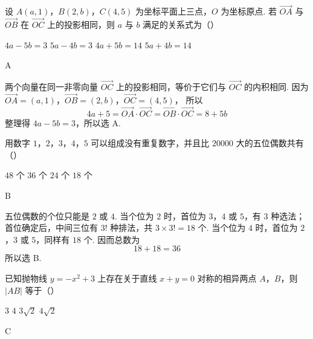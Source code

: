 \begin{problem}
设 \(A(a,1)\)，\(B(2,b)\)，\(C(4,5)\) 为坐标平面上三点，\(O\) 为坐标原点. 若 \(\overrightarrow{OA}\) 与 \(\overrightarrow{OB}\) 在 \(\overrightarrow{OC}\) 上的投影相同，则 \(a\) 与 \(b\) 满足的关系式为（\quad）

\choices
    {\(4a - 5b = 3\)}
    {\(5a - 4b = 3\)}
    {\(4a + 5b = 14\)}
    {\(5a + 4b = 14\)}
\end{problem}

\begin{answer}
A
\end{answer}

\begin{solution}
两个向量在同一非零向量 \(\overrightarrow{OC}\) 上的投影相同，等价于它们与 \(\overrightarrow{OC}\) 的内积相同. 因为 \(\overrightarrow{OA}=(a,1)\)，\(\overrightarrow{OB}=(2,b)\)，\(\overrightarrow{OC}=(4,5)\)，
所以
\[
4a+5=\overrightarrow{OA}\cdot\overrightarrow{OC}
 =\overrightarrow{OB}\cdot\overrightarrow{OC}=8+5b
\]
整理得 \(4a-5b=3\)，所以选 A.
\end{solution}

\begin{problem}
用数字 \(1\)，\(2\)，\(3\)，\(4\)，\(5\) 可以组成没有重复数字，并且比 \(20000\) 大的五位偶数共有（\quad）

\choices
    {\(48\) 个}
    {\(36\) 个}
    {\(24\) 个}
    {\(18\) 个}
\end{problem}

\begin{answer}
B
\end{answer}

\begin{solution}
五位偶数的个位只能是 \(2\) 或 \(4\). 当个位为 \(2\) 时，首位为 \(3\)，\(4\) 或 \(5\)，有 \(3\) 种选法；首位确定后，中间三位有 \(3!\) 种排法，共 \(3\times3!=18\) 个. 当个位为 \(4\) 时，首位为 \(2\)，\(3\) 或 \(5\)，同样有 \(18\) 个. 因而总数为
\[
18+18=36
\]
所以选 B.
\end{solution}

\begin{problem}
已知抛物线 \( y = -x^2 + 3 \) 上存在关于直线 \( x + y = 0 \) 对称的相异两点 \(A\)，\(B\)，则 \( |AB| \) 等于（\quad）

\choices
    {\(3\)}
    {\(4\)}
    {\(3 \sqrt{2}\)}
    {\(4\sqrt{2}\)}
\end{problem}

\begin{answer}
C
\end{answer}

